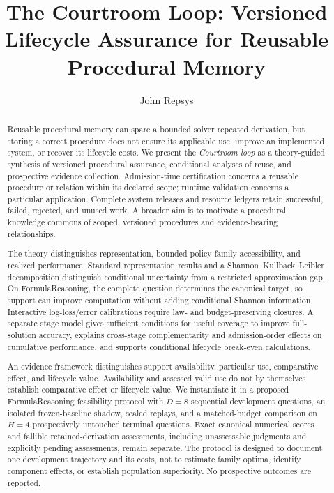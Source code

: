 \documentclass[10pt]{article} %
\title{The Courtroom Loop: Versioned Lifecycle Assurance for Reusable Procedural Memory}
\author{John Repsys}
\providecommand{\1}{\mathbf{1}}  %
\theoremstyle{remark}
\theoremstyle{definition}
\begin{document}
\maketitle

\begin{abstract}

Reusable procedural memory can spare a bounded solver repeated derivation,
but storing a correct procedure does not ensure its applicable use,
improve an implemented system, or recover its lifecycle costs. We present
the \emph{Courtroom loop} as a theory-guided synthesis of versioned
procedural assurance, conditional analyses of reuse, and prospective
evidence collection. Admission-time certification concerns a reusable
procedure or relation within its declared scope; runtime validation
concerns a particular application. Complete system releases and resource
ledgers retain successful, failed, rejected, and unused work. A broader
aim is to motivate a procedural knowledge commons of scoped, versioned
procedures and evidence-bearing relationships.

The theory distinguishes representation, bounded policy-family
accessibility, and realized performance. Standard representation results
and a Shannon--Kullback--Leibler decomposition distinguish conditional
uncertainty from a restricted approximation gap. On FormulaReasoning, the complete question
determines the canonical target, so support can improve computation
without adding conditional Shannon information. Interactive
log-loss/error calibrations require law- and budget-preserving closures.
A separate stage model gives sufficient conditions for useful coverage
to improve full-solution accuracy, explains cross-stage complementarity
and admission-order effects on cumulative performance, and supports
conditional lifecycle break-even calculations.

An evidence framework distinguishes support availability, particular
use, comparative effect, and lifecycle value. Availability and assessed
valid use do not by themselves establish comparative effect or lifecycle
value. We instantiate it in a proposed FormulaReasoning
feasibility protocol with $D=8$ sequential development questions, an
isolated frozen-baseline shadow, sealed replays, and a matched-budget
comparison on $H=4$ prospectively untouched terminal questions. Exact
canonical numerical scores and fallible retained-derivation assessments,
including unassessable judgments and explicitly pending assessments,
remain separate. The protocol is
designed to document one development trajectory and its costs, not to
estimate family optima, identify component effects, or establish
population superiority. No prospective outcomes are reported.

\end{abstract}
\end{document}
